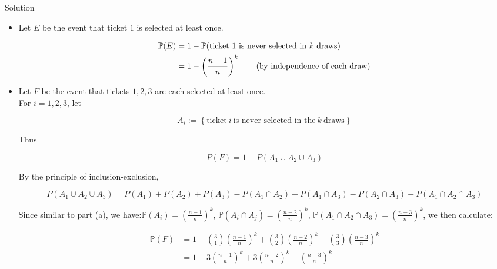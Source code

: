 \begin{qlsolution}{Solution}

\begin{itemize}
\item
  Let \(\mathit{E}\) be the event that ticket \(1\) is selected at least once.

  \begin{align*}
        \mathbb{P}(E) &= 1 - \mathbb{P}(\text{ticket $1$ is never selected in $k$ draws}) \\
        &= 1 - \left(\frac{n-1}{n}\right)^k \tag*{\text{(by independence of each draw)}}
    \end{align*}
\item
  Let \(\mathit{F}\) be the event that tickets \(1,2,3\) are each selected at least once.\\
  For \(\mathit{i} = 1,2,3\), let

  \[\mathit{A}_{\mathit{i}} := \left\{ {\text{ticket}\ \mathit{i}\ \text{is never selected in the}\ \mathit{k}\ \text{draws}} \right\}\]

  Thus

  \[\mathit{P}(\mathit{F}) = 1 - \mathit{P}(\mathit{A}_{1} \cup \mathit{A}_{2} \cup \mathit{A}_{3})\]

  By the principle of inclusion-exclusion,

  \[\mathit{P}(\mathit{A}_{1} \cup \mathit{A}_{2} \cup \mathit{A}_{3}) = \mathit{P}(\mathit{A}_{1}) + \mathit{P}(\mathit{A}_{2}) + \mathit{P}(\mathit{A}_{3}) - \mathit{P}(\mathit{A}_{1} \cap \mathit{A}_{2}) - \mathit{P}(\mathit{A}_{1} \cap \mathit{A}_{3}) - \mathit{P}(\mathit{A}_{2} \cap \mathit{A}_{3}) + \mathit{P}(\mathit{A}_{1} \cap \mathit{A}_{2} \cap \mathit{A}_{3})\]

  Since similar to part (a), we have:\(\mathbb{P}(\mathit{A}_{\mathit{i}}) = \left( \frac{\mathit{n} - 1}{\mathit{n}} \right)^{\mathit{k}}\), \(\mathbb{P}(\mathit{A}_{\mathit{i}} \cap \mathit{A}_{\mathit{j}}) = \left( \frac{\mathit{n} - 2}{\mathit{n}} \right)^{\mathit{k}}\), \(\mathbb{P}(\mathit{A}_{1} \cap \mathit{A}_{2} \cap \mathit{A}_{3}) = \left( \frac{\mathit{n} - 3}{\mathit{n}} \right)^{\mathit{k}}\), we then calculate:

  \[\begin{matrix}
  {\mathbb{P}(\mathit{F})} & {= 1 - \binom{3}{1}\left( \frac{\mathit{n} - 1}{\mathit{n}} \right)^{\mathit{k}} + \binom{3}{2}\left( \frac{\mathit{n} - 2}{\mathit{n}} \right)^{\mathit{k}} - \binom{3}{3}\left( \frac{\mathit{n} - 3}{\mathit{n}} \right)^{\mathit{k}}} \\
   & {= 1 - 3\left( \frac{\mathit{n} - 1}{\mathit{n}} \right)^{\mathit{k}} + 3\left( \frac{\mathit{n} - 2}{\mathit{n}} \right)^{\mathit{k}} - \left( \frac{\mathit{n} - 3}{\mathit{n}} \right)^{\mathit{k}}}
  \end{matrix}\]
\end{itemize}

\end{qlsolution}

